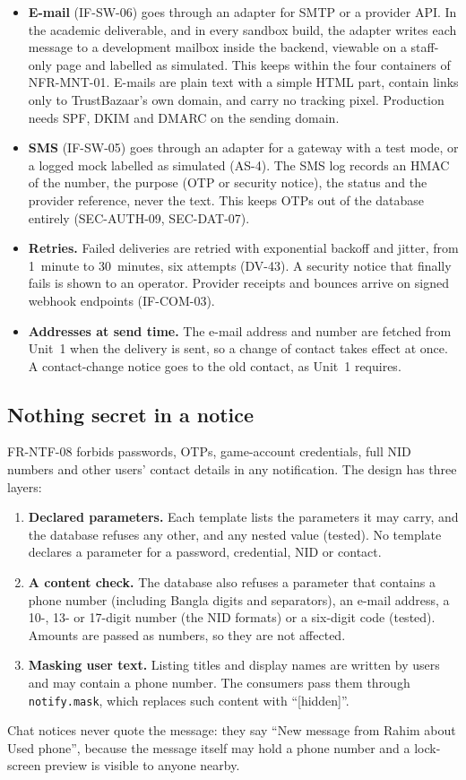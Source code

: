 \documentclass[11pt,a4paper]{article}
\begin{document}
\begin{itemize}[nosep]
  \item \textbf{E-mail} (IF-SW-06) goes through an adapter for SMTP or a provider API. In the academic deliverable, and in every sandbox build, the adapter writes each message to a development mailbox inside the backend, viewable on a staff-only page and labelled as simulated. This keeps within the four containers of NFR-MNT-01. E-mails are plain text with a simple HTML part, contain links only to TrustBazaar's own domain, and carry no tracking pixel. Production needs SPF, DKIM and DMARC on the sending domain.
  \item \textbf{SMS} (IF-SW-05) goes through an adapter for a gateway with a test mode, or a logged mock labelled as simulated (AS-4). The SMS log records an HMAC of the number, the purpose (OTP or security notice), the status and the provider reference, never the text. This keeps OTPs out of the database entirely (SEC-AUTH-09, SEC-DAT-07).
  \item \textbf{Retries.} Failed deliveries are retried with exponential backoff and jitter, from 1~minute to 30~minutes, six attempts (DV-43). A security notice that finally fails is shown to an operator. Provider receipts and bounces arrive on signed webhook endpoints (IF-COM-03).
  \item \textbf{Addresses at send time.} The e-mail address and number are fetched from Unit~1 when the delivery is sent, so a change of contact takes effect at once. A contact-change notice goes to the old contact, as Unit~1 requires.
\end{itemize}

\subsection{Nothing secret in a notice}
FR-NTF-08 forbids passwords, OTPs, game-account credentials, full NID numbers and other users' contact details in any notification. The design has three layers:
\begin{enumerate}[nosep]
  \item \textbf{Declared parameters.} Each template lists the parameters it may carry, and the database refuses any other, and any nested value (tested). No template declares a parameter for a password, credential, NID or contact.
  \item \textbf{A content check.} The database also refuses a parameter that contains a phone number (including Bangla digits and separators), an e-mail address, a 10-, 13- or 17-digit number (the NID formats) or a six-digit code (tested). Amounts are passed as numbers, so they are not affected.
  \item \textbf{Masking user text.} Listing titles and display names are written by users and may contain a phone number. The consumers pass them through \texttt{notify.mask}, which replaces such content with ``[hidden]''.
\end{enumerate}
Chat notices never quote the message: they say ``New message from Rahim about Used phone'', because the message itself may hold a phone number and a lock-screen preview is visible to anyone nearby.
\end{document}

